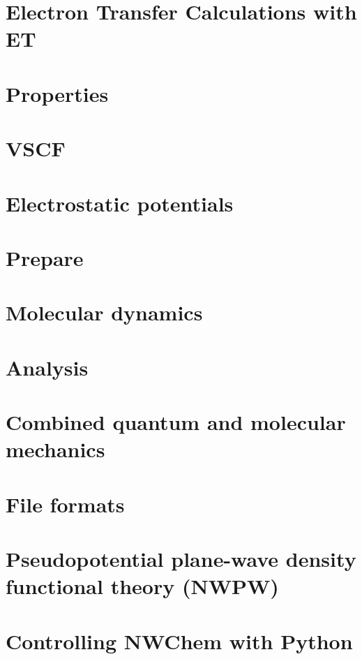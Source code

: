 \chapter{Electron Transfer Calculations with ET}


\chapter{Properties}


\chapter{VSCF}


\chapter{Electrostatic potentials}


\chapter{Prepare}


\chapter{Molecular dynamics}


\chapter{Analysis}


\chapter{Combined quantum and molecular mechanics}


\chapter{File formats}


\chapter{Pseudopotential plane-wave density functional theory (NWPW)}


\chapter{Controlling NWChem with Python}


